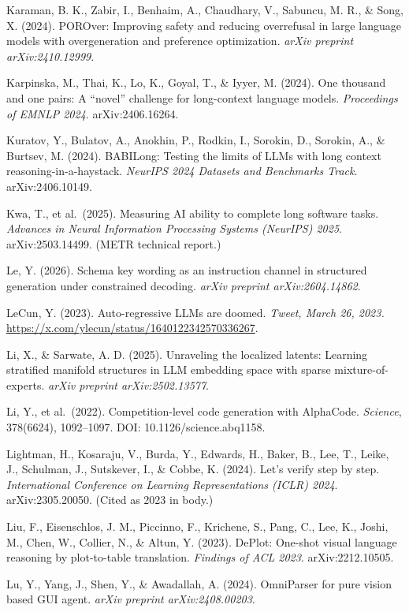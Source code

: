 \documentclass[
]{article}
\begin{document}
Karaman, B. K., Zabir, I., Benhaim, A., Chaudhary, V., Sabuncu, M. R.,
\& Song, X. (2024). POROver: Improving safety and reducing overrefusal
in large language models with overgeneration and preference
optimization. \emph{arXiv preprint arXiv:2410.12999}.

Karpinska, M., Thai, K., Lo, K., Goyal, T., \& Iyyer, M. (2024). One
thousand and one pairs: A ``novel'' challenge for long-context language
models. \emph{Proceedings of EMNLP 2024}. arXiv:2406.16264.

Kuratov, Y., Bulatov, A., Anokhin, P., Rodkin, I., Sorokin, D., Sorokin,
A., \& Burtsev, M. (2024). BABILong: Testing the limits of LLMs with
long context reasoning-in-a-haystack. \emph{NeurIPS 2024 Datasets and
Benchmarks Track}. arXiv:2406.10149.

Kwa, T., et al.~(2025). Measuring AI ability to complete long software
tasks. \emph{Advances in Neural Information Processing Systems (NeurIPS)
2025}. arXiv:2503.14499. (METR technical report.)

Le, Y. (2026). Schema key wording as an instruction channel in
structured generation under constrained decoding. \emph{arXiv preprint
arXiv:2604.14862}.

LeCun, Y. (2023). Auto-regressive LLMs are doomed. \emph{Tweet, March
26, 2023.} \url{https://x.com/ylecun/status/1640122342570336267}.

Li, X., \& Sarwate, A. D. (2025). Unraveling the localized latents:
Learning stratified manifold structures in LLM embedding space with
sparse mixture-of-experts. \emph{arXiv preprint arXiv:2502.13577}.

Li, Y., et al.~(2022). Competition-level code generation with AlphaCode.
\emph{Science}, 378(6624), 1092--1097. DOI: 10.1126/science.abq1158.

Lightman, H., Kosaraju, V., Burda, Y., Edwards, H., Baker, B., Lee, T.,
Leike, J., Schulman, J., Sutskever, I., \& Cobbe, K. (2024). Let's
verify step by step. \emph{International Conference on Learning
Representations (ICLR) 2024}. arXiv:2305.20050. (Cited as 2023 in body.)

Liu, F., Eisenschlos, J. M., Piccinno, F., Krichene, S., Pang, C., Lee,
K., Joshi, M., Chen, W., Collier, N., \& Altun, Y. (2023). DePlot:
One-shot visual language reasoning by plot-to-table translation.
\emph{Findings of ACL 2023}. arXiv:2212.10505.

Lu, Y., Yang, J., Shen, Y., \& Awadallah, A. (2024). OmniParser for pure
vision based GUI agent. \emph{arXiv preprint arXiv:2408.00203}.
\end{document}
